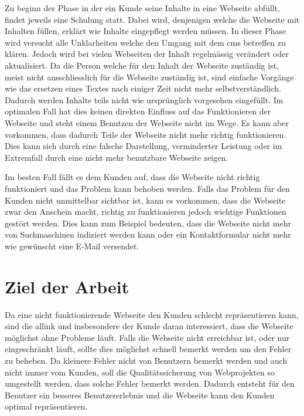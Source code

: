 Zu beginn der Phase in der ein Kunde seine Inhalte in eine Webseite abfüllt, findet jeweils eine Schulung statt. Dabei wird, denjenigen welche die Webseite mit Inhalten füllen, erklärt wie Inhalte eingepflegt werden müssen. In dieser Phase wird versucht alle Unklarheiten welche den Umgang mit dem \ac{cms} betreffen zu klären. Jedoch wird bei vielen Webseiten der Inhalt regelmässig verändert oder aktualisiert. Da die Person welche für den Inhalt der Webseite zuständig ist, meist nicht ausschliesslich für die Webseite zuständig ist, sind einfache Vorgänge wie das ersetzen eines Textes nach einiger Zeit nicht mehr selbstverständlich. Dadurch werden Inhalte teils nicht wie ursprünglich vorgesehen eingefüllt. Im optimalen Fall hat dies keinen direkten Einfluss auf das Funktionieren der Webseite und steht einem Benutzen der Webseite nicht im Wege. Es kann aber vorkommen, dass dadurch Teile der Webseite nicht mehr richtig funktionieren. Dies kann sich durch eine falsche Darstellung, verminderter Leistung oder im Extremfall durch eine nicht mehr benutzbare Webseite zeigen.

Im besten Fall fällt es dem Kunden auf, dass die Webseite nicht richtig funktioniert und das Problem kann behoben werden. Falls das Problem für den Kunden nicht unmittelbar sichtbar ist, kann es vorkommen, dass die Webseite zwar den Anschein macht, richtig zu funktionieren jedoch wichtige Funktionen gestört werden. Dies kann zum Beispiel bedeuten, dass die Webseite nicht mehr von Suchmaschinen indiziert werden kann oder ein Kontaktformular nicht mehr wie gewünscht eine E-Mail versendet.

\section{Ziel der Arbeit}
\label{sec:ziel_der_arbeit}
Da eine nicht funktionierende Webseite den Kunden schlecht repräsentieren kann, sind die allink und insbesondere der Kunde daran interessiert, dass die Webseite möglichst ohne Probleme läuft. Falls die Webseite nicht erreichbar ist, oder nur eingeschränkt läuft, sollte dies möglichst schnell bemerkt werden um den Fehler zu beheben. Da kleinere Fehler nicht von Benutzern bemerkt werden und auch nicht immer vom Kunden, soll die Qualitätssicherung von Webprojekten so umgestellt werden, dass solche Fehler bemerkt werden. Dadurch entsteht für den Benutzer ein besseres Benutzererlebnis und die Webseite kann den Kunden optimal repräsentieren.
